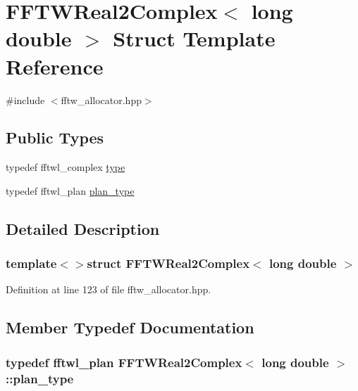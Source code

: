 \hypertarget{struct_f_f_t_w_real2_complex_3_01long_01double_01_4}{\section{F\-F\-T\-W\-Real2\-Complex$<$ long double $>$ Struct Template Reference}
\label{struct_f_f_t_w_real2_complex_3_01long_01double_01_4}
}


{\ttfamily \#include $<$fftw\-\_\-allocator.\-hpp$>$}

\subsection*{Public Types}
\begin{DoxyCompactItemize}
\item 
typedef fftwl\-\_\-complex \hyperlink{struct_f_f_t_w_real2_complex_3_01long_01double_01_4_a327f3e85d7a512030721ee4aedd6a7af}{type}
\item 
typedef fftwl\-\_\-plan \hyperlink{struct_f_f_t_w_real2_complex_3_01long_01double_01_4_ab51dc17bbef1121d6e6c67c5c5b0cccf}{plan\-\_\-type}
\end{DoxyCompactItemize}


\subsection{Detailed Description}
\subsubsection*{template$<$$>$struct F\-F\-T\-W\-Real2\-Complex$<$ long double $>$}



Definition at line 123 of file fftw\-\_\-allocator.\-hpp.



\subsection{Member Typedef Documentation}
\hypertarget{struct_f_f_t_w_real2_complex_3_01long_01double_01_4_ab51dc17bbef1121d6e6c67c5c5b0cccf}{
\subsubsection[{plan\-\_\-type}]{\setlength{\rightskip}{0pt plus 5cm}typedef fftwl\-\_\-plan {\bf F\-F\-T\-W\-Real2\-Complex}$<$ long double $>$\-::{\bf plan\-\_\-type}}}\label{struct_f_f_t_w_real2_complex_3_01long_01double_01_4_ab51dc17bbef1121d6e6c67c5c5b0cccf}


